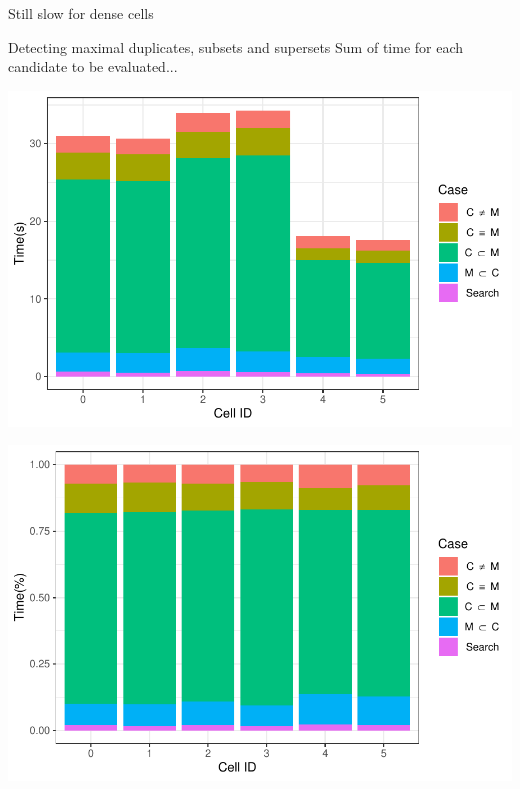 \documentclass{beamer}
\begin{document}
\begin{frame}{Still slow for dense cells}
\begin{frame}{Detecting maximal duplicates, subsets and supersets}
        {Sum of time for each candidate to be evaluated...}
        \centering
        \begin{minipage}{0.49\textwidth}
                \includegraphics[width=\textwidth]{figures/Maximals/performanceBySum1}
        \end{minipage} %
        \begin{minipage}{0.49\textwidth}
                \includegraphics[width=\textwidth]{figures/Maximals/performanceBySum2}
        \end{minipage}
\end{frame}


\end{frame}
\end{document}

